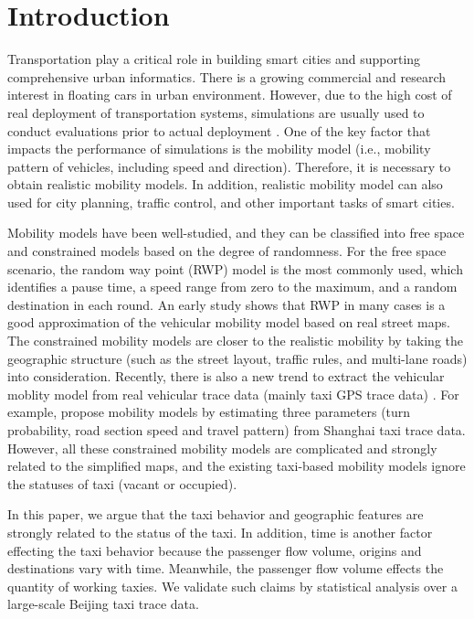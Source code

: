 \section{Introduction}
\label{section_introduction}

Transportation play a critical role in building smart cities and supporting comprehensive urban informatics\cite{trans-1}. There is a growing commercial and research interest in floating cars in urban environment. However, due to the high cost of real deployment of transportation systems, simulations are usually used to conduct evaluations prior to actual deployment \cite{whq-2009,xia-2012}. One of the key factor that impacts the performance of simulations is the mobility model (i.e., mobility pattern of vehicles, including speed and direction). Therefore, it is necessary to obtain realistic mobility models. In addition, realistic mobility model can also used for city planning, traffic control, and other important tasks of smart cities.

Mobility models \cite{LuChen-104,AhmedKarmakar-106,whq-2015} have been well-studied, and they can be classified into free space and constrained models based on the degree of randomness.
For the free space scenario, the random way point (RWP) model \cite{broch1998performance} is the most commonly used, which identifies a pause time, a speed range from zero to the maximum, and a random destination in each round. An early study \cite{SahaJohnson-91} shows that RWP in many cases is a good approximation of the vehicular mobility model based on real street maps. The constrained mobility models \cite{SahaJohnson-91,MartinezCano-87,ChoffnesBustamante-93}  are closer to the realistic mobility by taking the geographic structure (such as the street layout, traffic rules, and multi-lane roads) into consideration. Recently, there is also a new trend to extract the vehicular moblity model from real vehicular trace data (mainly taxi GPS trace data) \cite{KimKotz-99,HuangZhu-88}. For example, \cite{HuangZhu-88} propose mobility models by estimating three parameters (turn probability, road section speed and travel pattern) from Shanghai taxi trace data. However, all these constrained mobility models are complicated and strongly related to the simplified maps, and the existing taxi-based mobility models ignore the statuses of taxi (vacant or occupied).

In this paper, we argue that the taxi behavior and geographic features are strongly related to the status of the taxi. In addition, time is another factor effecting the taxi behavior because the passenger flow volume, origins and destinations vary with time. Meanwhile, the passenger flow volume effects the quantity of working taxies. We validate such claims by statistical analysis over a large-scale Beijing taxi trace data. 

